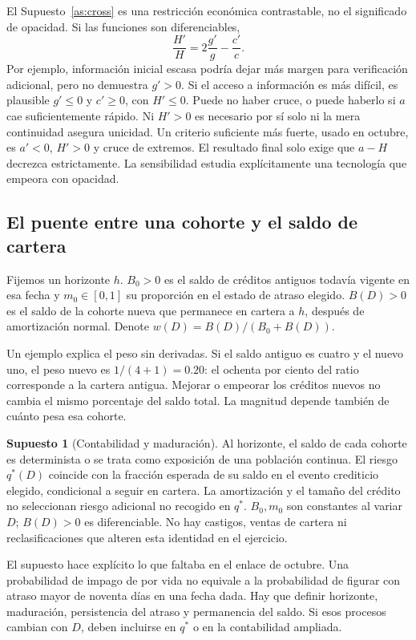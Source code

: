 \documentclass[11pt]{article}
\theoremstyle{definition}\newtheorem{assumption}{Supuesto}
\begin{document}
El Supuesto~\ref{as:cross} es una restricción económica contrastable, no el
significado de opacidad. Si las funciones son diferenciables,
\begin{equation}\label{eq:logs}
\frac{H'}H=2\frac{g'}g-\frac{c'}c.
\end{equation}
Por ejemplo, información inicial escasa podría dejar más margen para
verificación adicional, pero no demuestra $g'>0$. Si el acceso a información
es más difícil, es plausible $g'\le0$ y $c'\ge0$, con $H'\le0$. Puede no
haber cruce, o puede haberlo si $a$ cae suficientemente rápido. Ni $H'>0$ es
necesario por sí solo ni la mera continuidad asegura unicidad. Un criterio
suficiente más fuerte, usado en octubre, es $a'<0$, $H'>0$ y cruce de extremos.
El resultado final solo exige que $a-H$ decrezca estrictamente. La sensibilidad
estudia explícitamente una tecnología que empeora con opacidad.

\subsection{El puente entre una cohorte y el saldo de cartera}
Fijemos un horizonte $h$. $B_0>0$ es el saldo de créditos antiguos todavía
vigente en esa fecha y $m_0\in[0,1]$ su proporción en el estado de atraso
elegido. $B(D)>0$ es el saldo de la cohorte nueva que permanece en cartera a
$h$, después de amortización normal. Denote $w(D)=B(D)/(B_0+B(D))$.

Un ejemplo explica el peso sin derivadas. Si el saldo antiguo es cuatro y
el nuevo uno, el peso nuevo es $1/(4+1)=0.20$: el ochenta por ciento del
ratio corresponde a la cartera antigua. Mejorar o empeorar los créditos
nuevos no cambia el mismo porcentaje del saldo total. La magnitud depende
también de cuánto pesa esa cohorte.

\begin{assumption}[Contabilidad y maduración]\label{as:stock}
Al horizonte, el saldo de cada cohorte es determinista o se trata como
exposición de una población continua. El riesgo $q^*(D)$ coincide con la
fracción esperada de su saldo en el evento crediticio elegido, condicional
a seguir en cartera. La amortización y el tamaño del crédito no seleccionan
riesgo adicional no recogido en $q^*$. $B_0,m_0$ son constantes al variar $D$;
$B(D)>0$ es diferenciable. No hay castigos, ventas de cartera ni
reclasificaciones que alteren esta identidad en el ejercicio.
\end{assumption}
El supuesto hace explícito lo que faltaba en el enlace de octubre. Una
probabilidad de impago de por vida no equivale a la probabilidad de figurar
con atraso mayor de noventa días en una fecha dada. Hay que definir horizonte,
maduración, persistencia del atraso y permanencia del saldo. Si esos procesos
cambian con $D$, deben incluirse en $q^*$ o en la contabilidad ampliada.
\end{document}
